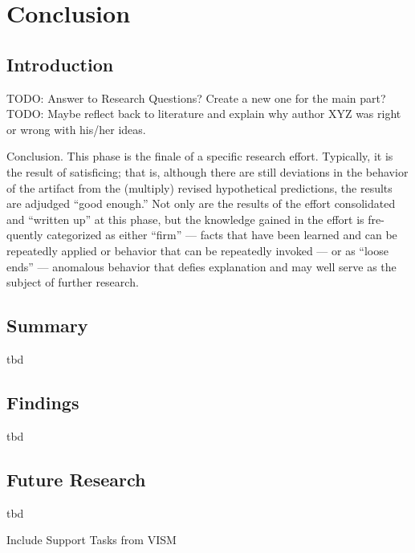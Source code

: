 
\chapter{Conclusion}

\label{ChapterConclusion}


\section{Introduction}

TODO: Answer to Research Questions? Create a new one for the main part?
TODO: Maybe reflect back to literature and explain why author XYZ was right or wrong with his/her ideas.

Conclusion. This phase is the finale of a specific research effort. Typically, it is the result of satisficing; that is, although there are still deviations in the behavior of the artifact from the (multiply) revised hypothetical predictions, the results are adjudged “good enough.” Not only are the results of the effort consolidated and “written up” at this phase, but the knowledge gained in the effort is fre- quently categorized as either “firm” — facts that have been learned and can be repeatedly applied or behavior that can be repeatedly invoked — or as “loose ends” — anomalous behavior that defies explanation and may well serve as the subject of further research.
\cite{Vaishnavi2008}




\section{Summary}

tbd




\section{Findings}

tbd




\section{Future Research}

tbd


Include Support Tasks from VISM